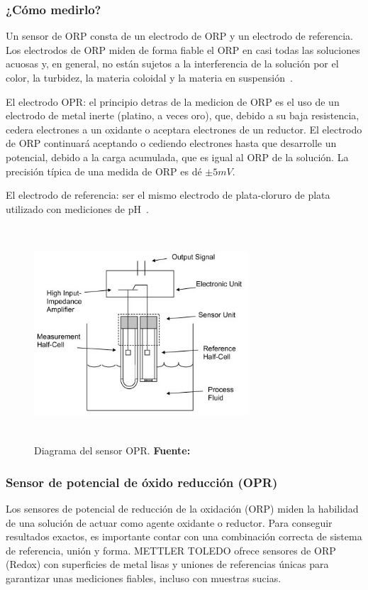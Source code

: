 \subsubsection{¿Cómo medirlo?}
Un sensor de ORP consta de un electrodo de ORP y un electrodo de referencia.
Los electrodos de ORP miden de forma fiable el ORP en casi todas las soluciones acuosas y, en general, no están sujetos a la interferencia de la solución por el color, la turbidez, la materia coloidal y la materia en suspensión~\cite{d19_committee_test_nodate}.

El electrodo OPR: el principio detras de la medicion de ORP es el uso de un electrodo de metal inerte (platino, a veces oro), que, debido a su baja resistencia, cedera electrones a un oxidante o aceptara electrones de un reductor. 
El electrodo de ORP continuará aceptando o cediendo electrones hasta que desarrolle un potencial, debido a la carga acumulada, que es igual al ORP de la solución. 
La precisión típica de una medida de ORP es d\'e \( \pm5 mV\).

El electrodo de referencia:  ser el mismo electrodo de plata-cloruro de plata utilizado con mediciones de pH~\cite{li_chapter_2019}.

    \begin{figure}[ht]
        \centering
        \includegraphics[width=80mm, height=80mm]{Imagenes/cap2/ORP_Sensor_Image.jpg}
        \caption {Diagrama del sensor OPR. \textbf{Fuente:}
        \cite{orp_sensor_measure_nodate} }
        \label{fig:opr}
    \end{figure}


\subsubsection{Sensor de potencial de \'oxido reducción (OPR)}
Los sensores de potencial de reducción de la oxidación (ORP) miden la habilidad de una solución de actuar como agente oxidante o reductor. 
Para conseguir resultados exactos, es importante contar con una combinación correcta de sistema de referencia, unión y forma. METTLER TOLEDO ofrece sensores de ORP (Redox) con superficies de metal lisas y uniones de referencias únicas para garantizar unas mediciones fiables, incluso con muestras sucias.

